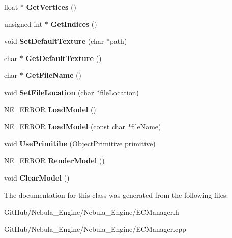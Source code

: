 \begin{DoxyCompactItemize}
\item 
\mbox{\label{class_entity_a5f00ee65265cc9a742ff737e10c91c70}} 
float $\ast$ {\bfseries Get\+Vertices} ()
\item 
\mbox{\label{class_entity_a586c6307c593df98dc8554800d49b14d}} 
unsigned int $\ast$ {\bfseries Get\+Indices} ()
\item 
\mbox{\label{class_entity_a2b750e35d5dc0425888c305486688bd7}} 
void {\bfseries Set\+Default\+Texture} (char $\ast$path)
\item 
\mbox{\label{class_entity_a57ed6fada3d0d1ba287ac640f80c10ca}} 
char $\ast$ {\bfseries Get\+Default\+Texture} ()
\item 
\mbox{\label{class_entity_aa787bc763776d93032677209f50d3d95}} 
char $\ast$ {\bfseries Get\+File\+Name} ()
\item 
\mbox{\label{class_entity_a9f97e6cde86f53eebbb80b987d431456}} 
void {\bfseries Set\+File\+Location} (char $\ast$file\+Location)
\item 
\mbox{\label{class_entity_a12224b8ddc23735430a780fd9577dbb5}} 
N\+E\+\_\+\+E\+R\+R\+OR {\bfseries Load\+Model} ()
\item 
\mbox{\label{class_entity_afb1b16e06c2340e8d36e68053218ea17}} 
N\+E\+\_\+\+E\+R\+R\+OR {\bfseries Load\+Model} (const char $\ast$file\+Name)
\item 
\mbox{\label{class_entity_a51be2d420b148e45225c25c82e044023}} 
void {\bfseries Use\+Primitibe} (Object\+Primitive primitive)
\item 
\mbox{\label{class_entity_a2958626e851c545c8d976c84f18dd157}} 
N\+E\+\_\+\+E\+R\+R\+OR {\bfseries Render\+Model} ()
\item 
\mbox{\label{class_entity_a2e58d45a3d40dc5fd5c1f08708928387}} 
void {\bfseries Clear\+Model} ()
\end{DoxyCompactItemize}


The documentation for this class was generated from the following files\+:\begin{DoxyCompactItemize}
\item 
Git\+Hub/\+Nebula\+\_\+\+Engine/\+Nebula\+\_\+\+Engine/E\+C\+Manager.\+h\item 
Git\+Hub/\+Nebula\+\_\+\+Engine/\+Nebula\+\_\+\+Engine/E\+C\+Manager.\+cpp\end{DoxyCompactItemize}
